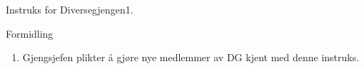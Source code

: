 \begin{instruks}{Instruks for Diversegjengen}{1. }{ }
     \begin{instruksledd}{Formidling}
            \begin{enumerate}
                \item Gjengsjefen plikter å gjøre nye medlemmer av DG kjent med denne instruks.
            \end{enumerate}
        \end{instruksledd}


\end{instruks}


